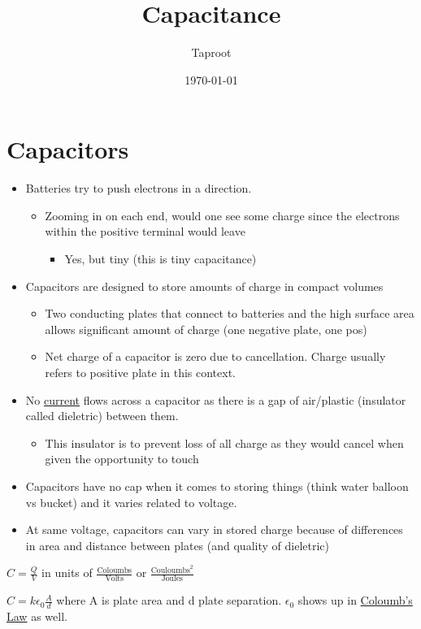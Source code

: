 \documentclass[letterpaper]{article}
\author{Taproot}
\date{\today}
\title{Capacitance}
\begin{document}
\section{Capacitors}
\label{sec:org1e5fc38}
\begin{itemize}
\item Batteries try to push electrons in a direction.
\begin{itemize}
\item Zooming in on each end, would one see some charge since the electrons within the positive terminal would leave
\begin{itemize}
\item Yes, but tiny (this is tiny capacitance)
\end{itemize}
\end{itemize}
\item Capacitors are designed to store amounts of charge in compact volumes
\begin{itemize}
\item Two conducting plates that connect to batteries and the high surface area allows significant amount of charge (one negative plate, one pos)
\item Net charge of a capacitor is zero due to cancellation. Charge usually refers to positive plate in this context.
\end{itemize}
\item No \href{20200909105807-current.org}{current} flows across a capacitor as there is a gap of air/plastic (insulator called dieletric) between them. 
\begin{itemize}
\item This insulator is to prevent loss of all charge as they would cancel when given the opportunity to touch
\end{itemize}
\item Capacitors have no cap when it comes to storing things (think water balloon vs bucket) and it varies related to voltage.
\item At same voltage, capacitors can vary in stored charge because of differences in area and distance between plates (and quality of dieletric)
\end{itemize}

\(C = \frac{Q}{V}\) in units of \(\frac{\text{Coloumbs}}{\text{Volts}}\) or \(\frac{\text{Couloumbs}^2}{\text{Joules}}\)

\(C = k\epsilon_0 \frac{A}{d}\) where A is plate area and d plate separation.
\(\epsilon_0\) shows up in \href{phys250-electricalforce.org}{Coloumb's Law} as well.
\end{document}
